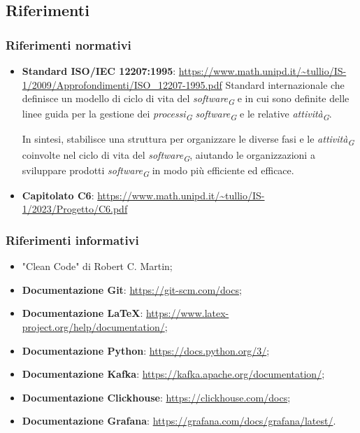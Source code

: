 \subsection{Riferimenti}
\subsubsection{Riferimenti normativi}
\begin{itemize}
    \item \textbf{Standard ISO/IEC 12207:1995}: \url{https://www.math.unipd.it/~tullio/IS-1/2009/Approfondimenti/ISO_12207-1995.pdf}
    Standard internazionale che definisce un modello di ciclo di vita del \textit{software}\textsubscript{\textit{G}} e in cui sono definite delle linee guida per la gestione dei \textit{processi}\textsubscript{\textit{G}} \textit{software}\textsubscript{\textit{G}} e le relative \textit{attività}\textsubscript{\textit{G}}.
    
    In sintesi, stabilisce una struttura per organizzare le diverse fasi e le \textit{attività}\textsubscript{\textit{G}} coinvolte nel ciclo di vita del \textit{software}\textsubscript{\textit{G}}, aiutando le organizzazioni a sviluppare prodotti \textit{software}\textsubscript{\textit{G}} in modo più efficiente ed efficace.

    \item \textbf{Capitolato C6}: \url{https://www.math.unipd.it/~tullio/IS-1/2023/Progetto/C6.pdf}

\end{itemize}

\subsubsection{Riferimenti informativi}
\begin{itemize}
    \item "Clean Code" di Robert C. Martin;
    \item \textbf{Documentazione Git}: \url{https://git-scm.com/docs};
    \item \textbf{Documentazione \LaTeX}: \url{https://www.latex-project.org/help/documentation/};
    \item \textbf{Documentazione Python}: \url{https://docs.python.org/3/};
    \item \textbf{Documentazione Kafka}: \url{https://kafka.apache.org/documentation/};
    \item \textbf{Documentazione Clickhouse}: \url{https://clickhouse.com/docs};
    \item \textbf{Documentazione Grafana}: \url{https://grafana.com/docs/grafana/latest/}.
\end{itemize}
